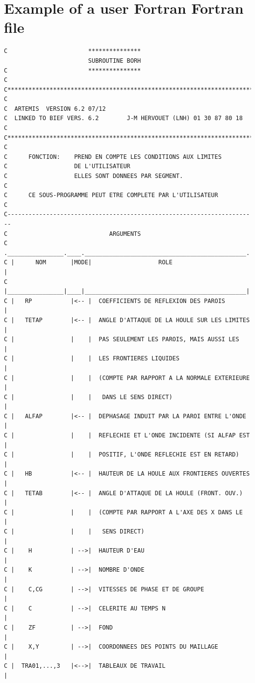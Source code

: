 \section{Example of a user Fortran Fortran file}
\begin{lstlisting}[language=TelFortran]
C                       ***************
                        SUBROUTINE BORH
C                       ***************
C
C***********************************************************************
C
C  ARTEMIS  VERSION 6.2 07/12
C  LINKED TO BIEF VERS. 6.2        J-M HERVOUET (LNH) 01 30 87 80 18
C
C***********************************************************************
C
C      FONCTION:    PREND EN COMPTE LES CONDITIONS AUX LIMITES
C                   DE L'UTILISATEUR
C                   ELLES SONT DONNEES PAR SEGMENT.
C
C      CE SOUS-PROGRAMME PEUT ETRE COMPLETE PAR L'UTILISATEUR
C
C-----------------------------------------------------------------------
C                             ARGUMENTS
C .________________.____.______________________________________________.
C |      NOM       |MODE|                   ROLE                       |
C |________________|____|______________________________________________|
C |   RP           |<-- |  COEFFICIENTS DE REFLEXION DES PAROIS        |
C |   TETAP        |<-- |  ANGLE D'ATTAQUE DE LA HOULE SUR LES LIMITES |
C |                |    |  PAS SEULEMENT LES PAROIS, MAIS AUSSI LES    |
C |                |    |  LES FRONTIERES LIQUIDES                     |
C |                |    |  (COMPTE PAR RAPPORT A LA NORMALE EXTERIEURE |
C |                |    |   DANS LE SENS DIRECT)                       |
C |   ALFAP        |<-- |  DEPHASAGE INDUIT PAR LA PAROI ENTRE L'ONDE  |
C |                |    |  REFLECHIE ET L'ONDE INCIDENTE (SI ALFAP EST |
C |                |    |  POSITIF, L'ONDE REFLECHIE EST EN RETARD)    |
C |   HB           |<-- |  HAUTEUR DE LA HOULE AUX FRONTIERES OUVERTES |
C |   TETAB        |<-- |  ANGLE D'ATTAQUE DE LA HOULE (FRONT. OUV.)   |
C |                |    |  (COMPTE PAR RAPPORT A L'AXE DES X DANS LE   |
C |                |    |   SENS DIRECT)                               |
C |    H           | -->|  HAUTEUR D'EAU                               |
C |    K           | -->|  NOMBRE D'ONDE                               |
C |    C,CG        | -->|  VITESSES DE PHASE ET DE GROUPE              |
C |    C           | -->|  CELERITE AU TEMPS N                         |
C |    ZF          | -->|  FOND                                        |
C |    X,Y         | -->|  COORDONNEES DES POINTS DU MAILLAGE          |
C |  TRA01,...,3   |<-->|  TABLEAUX DE TRAVAIL                         |

\end{lstlisting}
